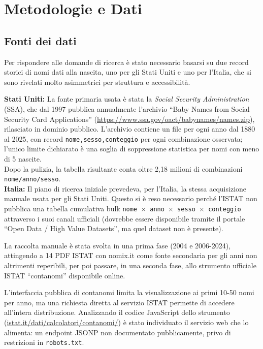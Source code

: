 \documentclass[conference]{IEEEtran}
\begin{document}
\section{Metodologie e Dati}
\label{sec:metodologie}

\subsection{Fonti dei dati}

Per rispondere alle domande di ricerca è stato necessario basarsi su due record storici di nomi dati 
alla nascita, uno per gli Stati Uniti e uno per l'Italia, che si sono rivelati molto asimmetrici
per struttura e accessibilità.

\textbf{Stati Uniti:} La fonte primaria usata è stata la \emph{Social Security Administration} (SSA), che dal
1997 pubblica annualmente l'archivio ``Baby Names from Social Security Card Applications''
(\url{https://www.ssa.gov/oact/babynames/names.zip}), rilasciato in dominio pubblico. L'archivio
contiene un file per ogni anno dal 1880 al 2025, con record \texttt{nome,sesso,conteggio} per ogni
combinazione osservata; l'unico limite dichiarato è una soglia di soppressione statistica per nomi con
meno di 5 nascite. \\
Dopo la pulizia, la tabella risultante conta oltre 2,18 milioni di combinazioni
\texttt{nome/anno/sesso}. \\
\textbf{Italia:} Il piano di ricerca iniziale prevedeva, per l'Italia, la stessa acquisizione manuale
usata per gli Stati Uniti. Questo si è reso necessario perché l'ISTAT non pubblica una tabella
cumulativa bulk \texttt{nome $\times$ anno $\times$ sesso $\times$ conteggio} attraverso i suoi canali
ufficiali (dovrebbe essere disponibile tramite il portale ``Open Data / High Value Datasets'', ma quel
dataset non è presente).

La raccolta manuale è stata svolta in una prima fase (2004 e 2006-2024),
attingendo a 14 PDF ISTAT con nomix.it come fonte secondaria per gli anni non altrimenti reperibili,
per poi passare, in una seconda fase, allo strumento ufficiale ISTAT ``contanomi'' disponibile online.

L'interfaccia pubblica di contanomi limita la visualizzazione ai primi 10-50 nomi per anno, ma una
richiesta diretta al servizio ISTAT permette di accedere all'intera distribuzione. Analizzando il
codice JavaScript dello strumento (\url{istat.it/dati/calcolatori/contanomi/}) è stato
individuato il servizio web che lo alimenta: un endpoint JSONP non documentato pubblicamente,
privo di restrizioni in \texttt{robots.txt}. 
\end{document}
